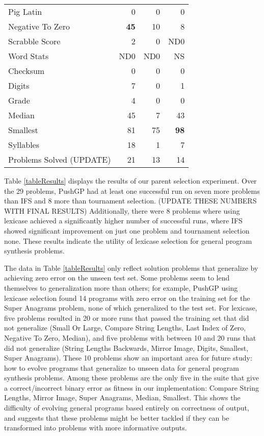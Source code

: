 \documentclass{sig-alternate}
\begin{document}
\begin{table}[t]
\begin{tabular}{|l|rrr|}
Pig Latin                  & 0        & 0       & 0   \\
Negative To Zero           & \textbf{45}       & 10      & 8   \\
Scrabble Score             & 2        & 0       & ND0    \\
Word Stats                 & ND0      & ND0     &  NS   \\
Checksum                   & 0         & 0        & 0    \\
Digits                     & 7        & 0       & 1   \\
Grade                      & 4        & 0       & 0   \\
Median                     & 45       & 7       & 43  \\
Smallest                   & 81       & 75      & \textbf{98}  \\
Syllables                  & 18       & 1       & 7   \\
\hline
Problems Solved (UPDATE)           & 21       & 13      & 14   \\
\hline
\end{tabular}
\end{table}


Table \ref{tableResults} displays the results of our parent selection experiment. Over the 29 problems, PushGP had at least one successful run on seven more problems than IFS and 8 more than tournament selection.
(UPDATE THESE NUMBERS WITH FINAL RESULTS)
Additionally, there were 8 problems where using lexicase achieved a significantly higher number of successful runs, where IFS showed significant improvement on just one problem and tournament selection none. These results indicate the utility of lexicase selection for general program synthesis problems.



The data in Table \ref{tableResults} only reflect solution problems that generalize by achieving zero error on the unseen test set. Some problems seem to lend themselves to generalization more than others; for example, PushGP using lexicase selection found 14 programs with zero error on the training set for the Super Anagrams problem, none of which generalized to the test set. For lexicase, five problems resulted in 20 or more runs that passed the training set that did not generalize (Small Or Large,
Compare String Lengths,
Last Index of Zero,
Negative To Zero,
Median),
and five problems with between 10 and 20 runs that did not generalize (String Lengths Backwards,
Mirror Image,
Digits,
Smallest,
Super Anagrams).
These 10 problems show an important area for future study: how to evolve programs that generalize to unseen data for general program synthesis problems. Among these problems are the only five in the suite that give a correct/incorrect binary error as fitness in our implementation: Compare String Lengths, Mirror Image, Super Anagrams, Median, Smallest. This shows the difficulty of evolving general programs based entirely on correctness of output, and suggests that these problems might be better tackled if they can be transformed into problems with more informative outputs.
\end{document}
